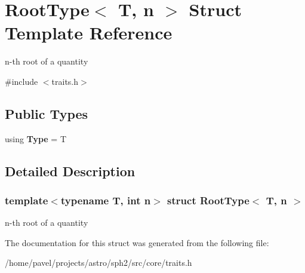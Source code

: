 \hypertarget{structRootType}{}\section{Root\+Type$<$ T, n $>$ Struct Template Reference}
\label{structRootType}


n-\/th root of a quantity  




{\ttfamily \#include $<$traits.\+h$>$}

\subsection*{Public Types}
\begin{DoxyCompactItemize}
\item 
\hypertarget{structRootType_a400498e4fac7797fdae5e7e8ea39015f}{}\label{structRootType_a400498e4fac7797fdae5e7e8ea39015f} 
using {\bfseries Type} = T
\end{DoxyCompactItemize}


\subsection{Detailed Description}
\subsubsection*{template$<$typename T, int n$>$\newline
struct Root\+Type$<$ T, n $>$}

n-\/th root of a quantity 

The documentation for this struct was generated from the following file\+:\begin{DoxyCompactItemize}
\item 
/home/pavel/projects/astro/sph2/src/core/traits.\+h\end{DoxyCompactItemize}
